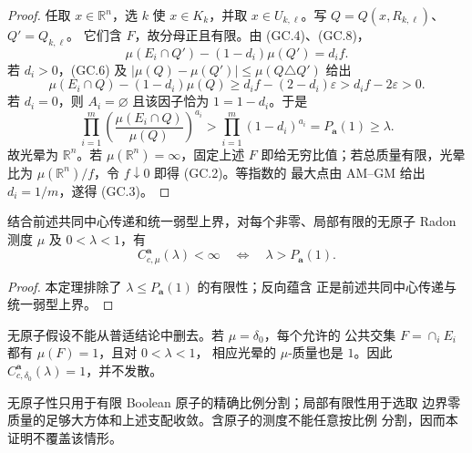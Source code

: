 \begin{proof}
任取 $x\in\mathbb R^n$，选 $k$ 使 $x\in K_k$，并取
$x\in U_{k,\ell}$。写 $Q=Q(x,R_{k,\ell})$、$Q'=Q_{k,\ell}$。
它们含 $F$，故分母正且有限。由 (GC.4)、(GC.8)，
\[
 \mu(E_i\cap Q')-(1-d_i)\mu(Q')=d_if. \tag{GC.9}
\]
若 $d_i>0$，(GC.6) 及
$|\mu(Q)-\mu(Q')|\le\mu(Q\triangle Q')$ 给出
\[
 \mu(E_i\cap Q)-(1-d_i)\mu(Q)
 \ge d_if-(2-d_i)\varepsilon>d_if-2\varepsilon>0. \tag{GC.10}
\]
若 $d_i=0$，则 $A_i=\varnothing$ 且该因子恰为 $1=1-d_i$。于是
\[
 \prod_{i=1}^m
 \left(\frac{\mu(E_i\cap Q)}{\mu(Q)}\right)^{a_i}
 >\prod_{i=1}^m(1-d_i)^{a_i}=P_{\boldsymbol a}(1)\ge\lambda. \tag{GC.11}
\]
故光晕为 $\mathbb R^n$。若 $\mu(\mathbb R^n)=\infty$，固定上述
$F$ 即给无穷比值；若总质量有限，光晕比为
$\mu(\mathbb R^n)/f$，令 $f\downarrow0$ 即得 (GC.2)。等指数的
最大点由 AM--GM 给出 $d_i=1/m$，遂得 (GC.3)。
\end{proof}

\begin{corollary}[精确有限性阈值]\label{cor:critical-threshold-round11}
结合前述共同中心传递和统一弱型上界，对每个非零、局部有限的无原子 Radon 测度
$\mu$ 及 $0<\lambda<1$，有
\[
 C_{c,\mu}^{\boldsymbol a}(\lambda)<\infty
 \quad\Longleftrightarrow\quad \lambda>P_{\boldsymbol a}(1).
\]
\end{corollary}
\begin{proof}
本定理排除了 $\lambda\le P_{\boldsymbol a}(1)$ 的有限性；反向蕴含
正是前述共同中心传递与统一弱型上界。
\end{proof}

\begin{remark}[原子性反例]
无原子假设不能从普适结论中删去。若 $\mu=\delta_0$，每个允许的
公共交集 $F=\cap_iE_i$ 都有 $\mu(F)=1$，且对 $0<\lambda<1$，
相应光晕的 $\mu$-质量也是 $1$。因此
\(C_{c,\delta_0}^{\boldsymbol a}(\lambda)=1\)，并不发散。
\end{remark}

\begin{remark}[假设的作用]
无原子性只用于有限 Boolean 原子的精确比例分割；局部有限性用于选取
边界零质量的足够大方体和上述支配收敛。含原子的测度不能任意按比例
分割，因而本证明不覆盖该情形。
\end{remark}
